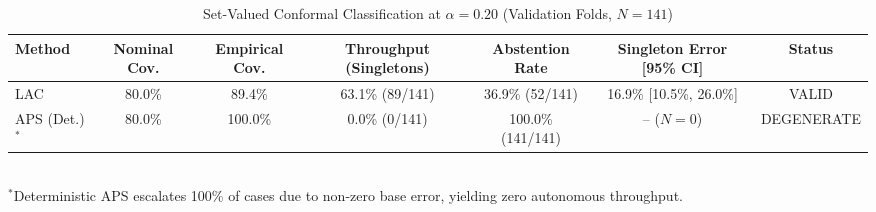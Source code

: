 \begin{table}[t]
\centering
\small
\caption{Set-Valued Conformal Classification at $\alpha = 0.20$ (Validation Folds, $N=141$)}
\label{tab:conformal_classification}
\begin{tabular}{lcccccc}
\toprule
\textbf{Method} & \textbf{Nominal Cov.} & \textbf{Empirical Cov.} & \textbf{Throughput (Singletons)} & \textbf{Abstention Rate} & \textbf{Singleton Error [95\% CI]} & \textbf{Status} \\
\midrule
LAC & 80.0\% & 89.4\% & 63.1\% (89/141) & 36.9\% (52/141) & 16.9\% [10.5\%, 26.0\%] & VALID \\
APS (Det.)$^*$ & 80.0\% & 100.0\% & 0.0\% (0/141) & 100.0\% (141/141) & -- ($N=0$) & DEGENERATE \\
\bottomrule
\end{tabular}
\\[2pt]
\footnotesize{$^*$Deterministic APS escalates 100\% of cases due to non-zero base error, yielding zero autonomous throughput.}
\end{table}
